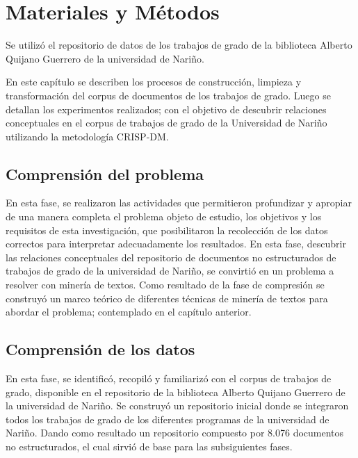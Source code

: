 \chapter{Materiales y Métodos}

Se utilizó el repositorio de datos de los trabajos de grado de la biblioteca Alberto Quijano Guerrero de la universidad de Nariño. 

En este capítulo se describen los procesos de construcción, limpieza y transformación
del corpus de documentos de los trabajos de grado. Luego se detallan los experimentos
realizados; con el objetivo de descubrir relaciones conceptuales en el corpus de trabajos
de grado de la Universidad de Nariño utilizando la metodología CRISP-DM.



\section{Comprensión del problema}

En esta fase, se realizaron las actividades que permitieron profundizar y apropiar de una manera completa el problema objeto de estudio, los objetivos y los requisitos de esta investigación,
 que posibilitaron la recolección de los datos correctos para interpretar adecuadamente los resultados. En esta fase, descubrir las relaciones conceptuales del repositorio de documentos no estructurados de trabajos de grado de la universidad de Nariño,
 se convirtió en un problema a resolver con minería de textos.  Como resultado de la fase de compresión se construyó un marco teórico de diferentes técnicas de minería  de textos para abordar el problema; contemplado en el capítulo anterior.

\section {Comprensión de los datos}

En esta fase, se identificó, recopiló y familiarizó con el corpus de trabajos de grado, disponible en el repositorio de la biblioteca Alberto Quijano Guerrero de la universidad de Nariño.
Se construyó un repositorio inicial donde se integraron todos los trabajos de grado de los diferentes programas de la universidad de Nariño. Dando como resultado un repositorio compuesto por 8.076 documentos no estructurados, el cual sirvió de base para las subsiguientes fases. 

